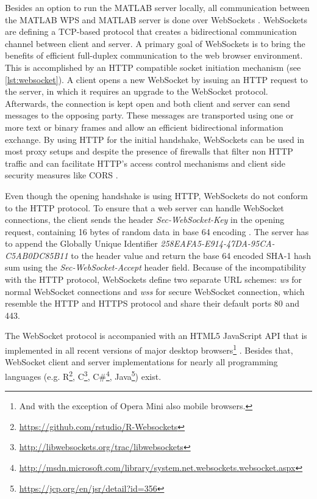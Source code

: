     Besides an option to run the MATLAB server locally, all communication between the MATLAB WPS and MATLAB server is done over WebSockets \citep{ietf:rfc6455}. WebSockets are defining a TCP-based protocol that creates a bidirectional communication channel between client and server. A primary goal of WebSockets is to bring the benefits of efficient full-duplex communication to the web browser environment. This is accomplished by an HTTP compatible socket initiation mechanism (see \cref{lst:websocket}). A client opens a new WebSocket by issuing an HTTP request to the server, in which it requires an upgrade to the WebSocket protocol. Afterwards, the connection is kept open and both client and server can send messages to the opposing party. These messages are transported using one or more text or binary frames and allow an efficient bidirectional information exchange. By using HTTP for the initial handshake, WebSockets can be used in most proxy setups and despite the presence of firewalls that filter non HTTP traffic and can facilitate HTTP's access control mechanisms and client side security measures like \acl{CORS} \citep[\acs{CORS},][]{w3c:cors}.

    

    Even though the opening handshake is using HTTP, WebSockets do not conform to the HTTP protocol. To ensure that a web server can handle WebSocket connections, the client sends the header \emph{Sec-WebSocket-Key} in the opening request, containing 16 bytes of random data in base 64 encoding \citep{ietf:rfc4648}. The server has to append the Globally Unique Identifier \cite[GUID,][]{ietf:rfc4122} \emph{258EAFA5-E914-47DA-95CA-C5AB0DC85B11} to the header value and return the base 64 encoded SHA-1 \citep{NistFIPS1803} hash sum using the \emph{Sec-WebSocket-Accept} header field. Because of the incompatibility with the HTTP protocol, WebSockets define two separate URL schemes: \emph{ws} for normal WebSocket connections and \emph{wss} for secure WebSocket connection, which resemble the HTTP and HTTPS protocol and share their default ports 80 and 443.

    The WebSocket protocol is accompanied with an HTML5 JavaScript \ac{API} \citep{w3c:ws} that is implemented in all recent versions of major desktop browsers\footnote{And with the exception of Opera Mini also mobile browsers.} \citep{caniuse}. Besides that, WebSocket client and server implementations for nearly all programming languages (e.g. R\footnote{\url{https://github.com/rstudio/R-Websockets}}, C\footnote{\url{http://libwebsockets.org/trac/libwebsockets}}, C\#\footnote{\url{http://msdn.microsoft.com/library/system.net.websockets.websocket.aspx}}, Java\footnote{\url{https://jcp.org/en/jsr/detail?id=356}}) exist.


